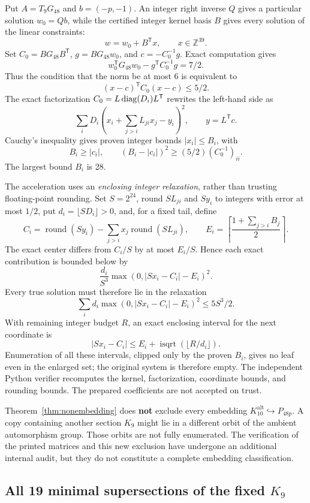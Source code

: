 \documentclass[11pt,a4paper]{article}
\theoremstyle{remark}\newtheorem{remark}[theorem]{Remark}
\newcommand{\Z}{\mathbb Z}\newcommand{\R}{\mathbb R}\newcommand{\F}{\mathbb F}
\newcommand{\Kalt}{K_{10}^{\mathrm{alt}}}
\begin{document}
Put $A=T_9G_{48}$ and $b=(-p,-1)$. An integer right inverse $Q$ gives a particular solution $w_0=Qb$, while the certified integer kernel basis $B$ gives every solution of the linear constraints:
\[
w=w_0+B^{\mathsf T}x,\qquad x\in\Z^{39}.
\]
Set $C_0=BG_{48}B^{\mathsf T}$, $g=BG_{48}w_0$, and $c=-C_0^{-1}g$. Exact computation gives
\[
w_0^{\mathsf T}G_{48}w_0-g^{\mathsf T}C_0^{-1}g=7/2.
\]
Thus the condition that the norm be at most 6 is equivalent to
\[
(x-c)^{\mathsf T}C_0(x-c)\le5/2.
\]
The exact factorization $C_0=L\operatorname{diag}(D_i)L^{\mathsf T}$ rewrites the left-hand side as
\[
\sum_iD_i\left(x_i+\sum_{j>i}L_{ji}x_j-y_i\right)^2,\qquad y=L^{\mathsf T}c.
\]
Cauchy's inequality gives proven integer bounds $|x_i|\le B_i$, with
\[
B_i\ge|c_i|,\qquad (B_i-|c_i|)^2\ge(5/2)(C_0^{-1})_{ii}.
\]
The largest bound $B_i$ is 28.

The acceleration uses an \emph{enclosing integer relaxation}, rather than trusting floating-point rounding. Set $S=2^{24}$, round $SL_{ji}$ and $Sy_i$ to integers with error at most $1/2$, put $d_i=\lfloor SD_i\rfloor>0$, and, for a fixed tail, define
\[
C_i=\operatorname{round}(Sy_i)-\sum_{j>i}x_j\operatorname{round}(SL_{ji}),\qquad
E_i=\left\lceil\frac{1+\sum_{j>i}B_j}{2}\right\rceil.
\]
The exact center differs from $C_i/S$ by at most $E_i/S$. Hence each exact contribution is bounded below by
\[
\frac{d_i}{S^3}\max(0,|Sx_i-C_i|-E_i)^2.
\]
Every true solution must therefore lie in the relaxation
\[
\sum_i d_i\max(0,|Sx_i-C_i|-E_i)^2\le5S^3/2.
\]
With remaining integer budget $R$, an exact enclosing interval for the next coordinate is
\[
|Sx_i-C_i|\le E_i+\operatorname{isqrt}(\lfloor R/d_i\rfloor).
\]
Enumeration of all these intervals, clipped only by the proven $B_i$, gives no leaf even in the enlarged set; the original system is therefore empty. The independent Python verifier recomputes the kernel, factorization, coordinate bounds, and rounding bounds. The prepared coefficients are not accepted on trust.

Theorem~\ref{thm:nonembedding} does \textbf{not} exclude every embedding $\Kalt\hookrightarrow P_{48p}$. A copy containing another section $K_9$ might lie in a different orbit of the ambient automorphism group. Those orbits are not fully enumerated. The verification of the printed matrices and this new exclusion have undergone an additional internal audit, but they do not constitute a complete embedding classification.

\subsection{All 19 minimal supersections of the fixed \texorpdfstring{$K_9$}{K9}}
\end{document}
